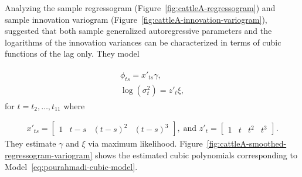 %
%

Analyzing the sample regressogram (Figure~\ref{fig:cattleA-regressogram}) and sample innovation variogram (Figure~\ref{fig:cattleA-innovation-variogram}), \cite{pourahmadi1999joint} suggested that both sample generalized autoregressive parameters and the logarithms of the innovation variances can be characterized in terms of cubic functions of the lag only. They model 

\begin{align}
\begin{split} \label{eq:pourahmadi-cubic-model}
\phi_{ts} = x'_{ts}\gamma, \\
\log\left(\sigma_t^2\right) = z'_{t}\xi, 
\end{split}
\end{align}
\noindent
for $t = t_2,\dots, t_{11}$ where 

\begin{align*}
x'_{ts} = \begin{bmatrix} 1 & t - s& \left(t - s\right)^2 & \left(t - s\right)^3 \end{bmatrix},\; \mbox{and } z'_{t} = \begin{bmatrix} 1 & t& t^2& t^3 \end{bmatrix}.
\end{align*}
\noindent
They estimate $\gamma$ and $\xi$ via maximum likelihood.  Figure~\ref{fig:cattleA-smoothed-regressogram-variogram} shows the estimated cubic polynomials corresponding to Model~\ref{eq:pourahmadi-cubic-model}. 


